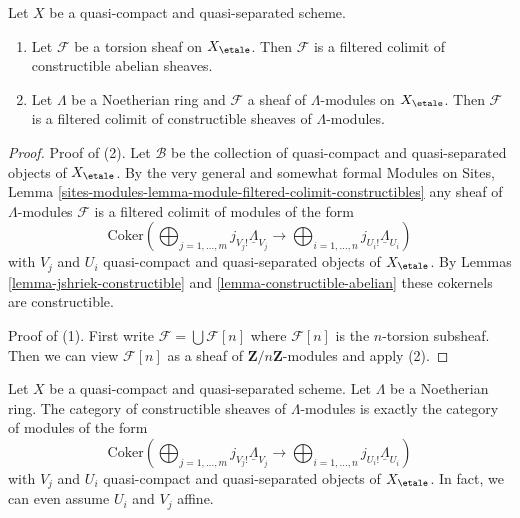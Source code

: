 \begin{lemma}
\label{lemma-torsion-colimit-constructible}
Let $X$ be a quasi-compact and quasi-separated scheme.
\begin{enumerate}
\item Let $\mathcal{F}$ be a torsion sheaf on $X_\etale$.
Then $\mathcal{F}$ is a filtered colimit of constructible abelian sheaves.
\item Let $\Lambda$ be a Noetherian ring and $\mathcal{F}$ a sheaf
of $\Lambda$-modules on $X_\etale$. Then
$\mathcal{F}$ is a filtered colimit of constructible sheaves of
$\Lambda$-modules.
\end{enumerate}
\end{lemma}

\begin{proof}
Proof of (2). Let $\mathcal{B}$ be the collection of quasi-compact
and quasi-separated objects of $X_\etale$. By the very general
and somewhat formal Modules on Sites,
Lemma \ref{sites-modules-lemma-module-filtered-colimit-constructibles}
any sheaf of $\Lambda$-modules $\mathcal{F}$ is a filtered colimit
of modules of the form
$$
\text{Coker}\left(
\bigoplus\nolimits_{j = 1, \ldots, m} j_{V_j!}\underline{\Lambda}_{V_j}
\longrightarrow
\bigoplus\nolimits_{i = 1, \ldots, n} j_{U_i!}\underline{\Lambda}_{U_i}
\right)
$$
with $V_j$ and $U_i$ quasi-compact and quasi-separated objects
of $X_\etale$. By
Lemmas \ref{lemma-jshriek-constructible} and \ref{lemma-constructible-abelian}
these cokernels are constructible.

\medskip\noindent
Proof of (1). First write $\mathcal{F} = \bigcup \mathcal{F}[n]$ where
$\mathcal{F}[n]$ is the $n$-torsion subsheaf. Then we can view
$\mathcal{F}[n]$ as a sheaf of $\mathbf{Z}/n\mathbf{Z}$-modules
and apply (2).
\end{proof}

\begin{proposition}
\label{proposition-category-constructible}
Let $X$ be a quasi-compact and quasi-separated scheme. Let $\Lambda$
be a Noetherian ring. The category of constructible sheaves of
$\Lambda$-modules is exactly the category of modules of the form
$$
\text{Coker}\left(
\bigoplus\nolimits_{j = 1, \ldots, m} j_{V_j!}\underline{\Lambda}_{V_j}
\longrightarrow
\bigoplus\nolimits_{i = 1, \ldots, n} j_{U_i!}\underline{\Lambda}_{U_i}
\right)
$$
with $V_j$ and $U_i$ quasi-compact and quasi-separated objects of
$X_\etale$. In fact, we can even assume $U_i$ and $V_j$ affine.
\end{proposition}

